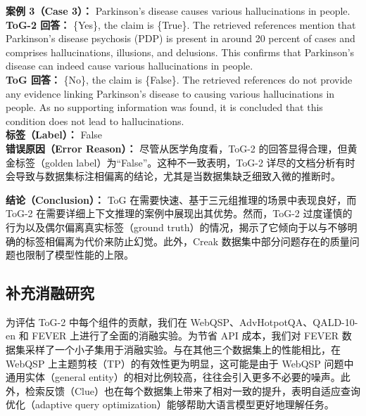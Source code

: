 \documentclass[11pt,UTF8,fontset=fandol]{ctexart}
\newcommand{\toctwo}{ToG-2}
\begin{document}
\noindent\textbf{案例 3（Case 3）：} Parkinson's disease causes various hallucinations in people.\\
\textbf{\toctwo{} 回答：} \{Yes\}, the claim is \{True\}. The retrieved references mention that Parkinson's disease psychosis (PDP) is present in around 20 percent of cases and comprises hallucinations, illusions, and delusions. This confirms that Parkinson's disease can indeed cause various hallucinations in people.\\
\textbf{ToG 回答：} \{No\}, the claim is \{False\}. The retrieved references do not provide any evidence linking Parkinson's disease to causing various hallucinations in people. As no supporting information was found, it is concluded that this condition does not lead to hallucinations.\\
\textbf{标签（Label）：} False\\
\textbf{错误原因（Error Reason）：} 尽管从医学角度看，\toctwo{} 的回答显得合理，但黄金标签（golden label）为“False”。这种不一致表明，\toctwo{} 详尽的文档分析有时会导致与数据集标注相偏离的结论，尤其是当数据集缺乏细致入微的推断时。

\noindent\textbf{结论（Conclusion）：} ToG 在需要快速、基于三元组推理的场景中表现良好，而 \toctwo{} 在需要详细上下文推理的案例中展现出其优势。然而，\toctwo{} 过度谨慎的行为以及偶尔偏离真实标签（ground truth）的情况，揭示了它倾向于以与不够明确的标签相偏离为代价来防止幻觉。此外，Creak 数据集中部分问题存在的质量问题也限制了模型性能的上限。

\subsection{补充消融研究}

为评估 \toctwo{} 中每个组件的贡献，我们在 WebQSP、AdvHotpotQA、QALD-10-en 和 FEVER 上进行了全面的消融实验。为节省 API 成本，我们对 FEVER 数据集采样了一个小子集用于消融实验。与在其他三个数据集上的性能相比，在 WebQSP 上主题剪枝（TP）的有效性更为明显，这可能是由于 WebQSP 问题中通用实体（general entity）的相对比例较高，往往会引入更多不必要的噪声。此外，检索反馈（Clue）也在每个数据集上带来了相对一致的提升，表明自适应查询优化（adaptive query optimization）能够帮助大语言模型更好地理解任务。
\end{document}
